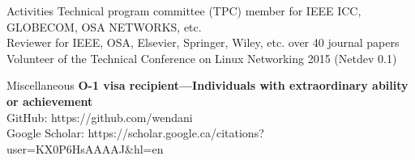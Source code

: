\documentclass{resume} %
\begin{document}
\begin{rSection}{Activities}
Technical program committee (TPC) member for IEEE ICC, GLOBECOM, OSA NETWORKS, etc. \\
Reviewer for IEEE, OSA, Elsevier, Springer, Wiley, etc. over 40 journal papers\\
Volunteer of the Technical Conference on Linux Networking 2015 (Netdev 0.1)
\end{rSection}



\begin{rSection}{Miscellaneous}
\textbf{O-1 visa recipient---Individuals with extraordinary ability or achievement}\\
GitHub: https://github.com/wendani \\
Google Scholar: https://scholar.google.ca/citations?user=KX0P6HsAAAAJ\&hl=en
\end{rSection}
\end{document}
